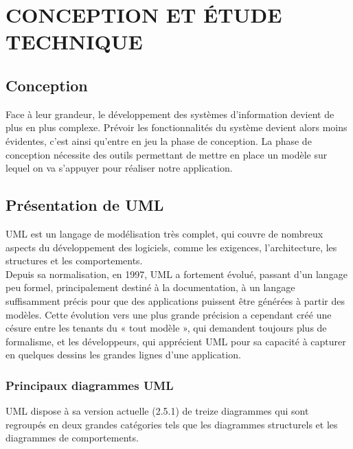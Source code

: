 \chapter{CONCEPTION ET ÉTUDE TECHNIQUE}
	\section{Conception}
	
	Face à leur grandeur, le développement des systèmes d'information devient de plus en plus complexe. Prévoir les fonctionnalités du système devient alors moins évidentes, c'est ainsi qu'entre en jeu la phase de conception. La phase de conception nécessite des outils permettant de mettre en place un modèle sur lequel on va s'appuyer pour réaliser notre application.
	

	\section{Présentation de UML}
			UML est un langage de modélisation très complet, qui couvre de nombreux aspects du développement des logiciels, comme les exigences, l’architecture, les structures et les comportements.\\
			
			Depuis sa normalisation, en 1997, UML a fortement évolué, passant d’un langage peu	formel, principalement destiné à la documentation, à un langage suffisamment précis pour que des applications puissent être générées à partir des modèles. Cette évolution	vers une plus grande précision a cependant créé une césure entre les tenants du « tout modèle », qui demandent toujours plus de formalisme, et les développeurs, qui apprécient UML pour sa capacité à capturer en quelques dessins les grandes lignes d’une
			application.
		\subsection{Principaux diagrammes UML}
			UML dispose à sa version actuelle (2.5.1) de treize diagrammes qui sont regroupés en deux grandes catégories tels que les diagrammes structurels et les diagrammes de comportements.
